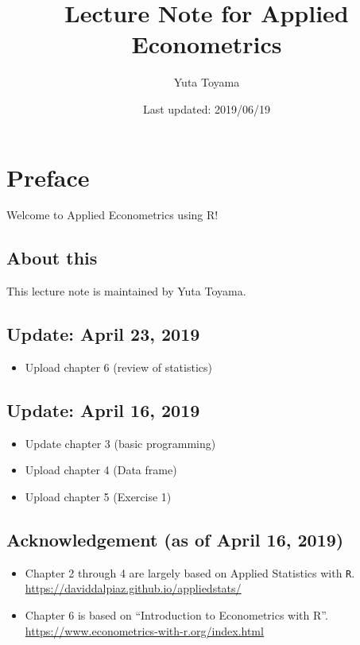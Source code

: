\documentclass[]{book}
\title{Lecture Note for Applied Econometrics}
\author{Yuta Toyama}
\date{Last updated: 2019/06/19}
\providecommand{\tightlist}{%
  \setlength{\itemsep}{0pt}\setlength{\parskip}{0pt}}
\begin{document}
\maketitle

{
\setcounter{tocdepth}{1}
\tableofcontents
}
\chapter{Preface}\label{preface}

Welcome to Applied Econometrics using R!

\section{About this}\label{about-this}

This lecture note is maintained by Yuta Toyama.

\section{Update: April 23, 2019}\label{update-april-23-2019}

\begin{itemize}
\tightlist
\item
  Upload chapter 6 (review of statistics)
\end{itemize}

\section{Update: April 16, 2019}\label{update-april-16-2019}

\begin{itemize}
\tightlist
\item
  Update chapter 3 (basic programming)
\item
  Upload chapter 4 (Data frame)
\item
  Upload chapter 5 (Exercise 1)
\end{itemize}

\section{Acknowledgement (as of April 16,
2019)}\label{acknowledgement-as-of-april-16-2019}

\begin{itemize}
\tightlist
\item
  Chapter 2 through 4 are largely based on Applied Statistics with
  \texttt{R}. \url{https://daviddalpiaz.github.io/appliedstats/}
\item
  Chapter 6 is based on ``Introduction to Econometrics with R''.
  \url{https://www.econometrics-with-r.org/index.html}
\end{itemize}
\end{document}
